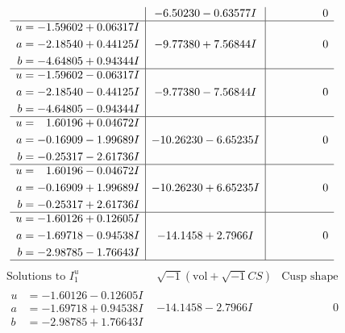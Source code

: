 \documentclass[1p]{elsarticle_modified}
\theoremstyle{definition}
\newcommand{\I}{\sqrt{-1}}
\begin{document}
$$\begin{array}{c|c|c}
 & -6.50230 - 0.63577 I & \phantom{-0.000000 } 0 \\ \hline\begin{aligned}
u &= -1.59602 + 0.06317 I \\
a &= -2.18540 + 0.44125 I \\
b &= -4.64805 + 0.94344 I\end{aligned}
 & -9.77380 + 7.56844 I & \phantom{-0.000000 } 0 \\ \hline\begin{aligned}
u &= -1.59602 - 0.06317 I \\
a &= -2.18540 - 0.44125 I \\
b &= -4.64805 - 0.94344 I\end{aligned}
 & -9.77380 - 7.56844 I & \phantom{-0.000000 } 0 \\ \hline\begin{aligned}
u &= \phantom{-}1.60196 + 0.04672 I \\
a &= -0.16909 - 1.99689 I \\
b &= -0.25317 - 2.61736 I\end{aligned}
 & -10.26230 - 6.65235 I & \phantom{-0.000000 } 0 \\ \hline\begin{aligned}
u &= \phantom{-}1.60196 - 0.04672 I \\
a &= -0.16909 + 1.99689 I \\
b &= -0.25317 + 2.61736 I\end{aligned}
 & -10.26230 + 6.65235 I & \phantom{-0.000000 } 0 \\ \hline\begin{aligned}
u &= -1.60126 + 0.12605 I \\
a &= -1.69718 - 0.94538 I \\
b &= -2.98785 - 1.76643 I\end{aligned}
 & -14.1458 + 2.7966 I & \phantom{-0.000000 } 0\\
 \hline 
 \end{array}$$\newpage$$\begin{array}{c|c|c}  
\text{Solutions to }I^u_{1}& \I (\text{vol} + \sqrt{-1}CS) & \text{Cusp shape}\\
 \hline 
\begin{aligned}
u &= -1.60126 - 0.12605 I \\
a &= -1.69718 + 0.94538 I \\
b &= -2.98785 + 1.76643 I\end{aligned}
 & -14.1458 - 2.7966 I & \phantom{-0.000000 } 0 \\ \hline\begin{aligned}

\end{aligned}
\end{array}$$
\end{document}
